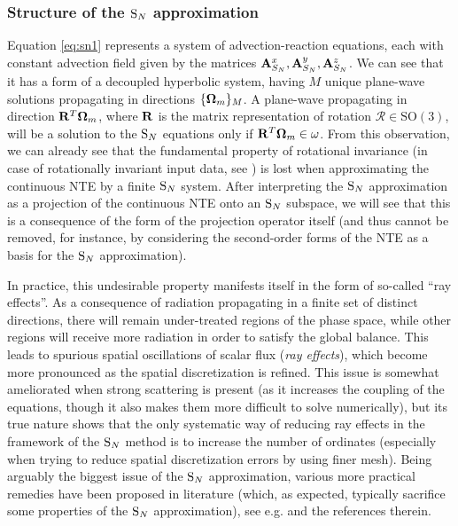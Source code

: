 \subsubsection{Structure of the $\text{S}_{N}$ approximation}
Equation \eqref{eq:sn1} represents a system of advection-reaction equations, each with constant advection field given by
the matrices $\mathbf{A}_{S_N}^x, \mathbf{A}_{S_N}^y, \mathbf{A}_{S_N}^z$. We can see that it has a form of a decoupled
hyperbolic system, having $M$ unique plane-wave solutions propagating in directions $\{\mathbf{\Omega}_m\}_{M}$. A
plane-wave propagating in direction $\mathbf{R}^T\mathbf{\Omega}_m$, where $\mathbf{R}$ is the matrix representation of rotation
$\mathcal{R}\in \mathrm{SO}(3)$, will be a solution to the $\text{S}_{N}$ equations only if $\mathbf{R}^T\mathbf{\Omega}_m \in \omega$. From
this observation, we can already see that the fundamental property of rotational invariance (in case of rotationally
invariant input data, see ) is lost when approximating the continuous NTE by a finite $\text{S}_{N}$ system.
After interpreting the $\text{S}_{N}$ approximation as a projection of the continuous NTE onto an $\text{S}_{N}$ subspace, we will see
that this is a consequence of the form of the projection operator itself (and thus cannot be removed, for instance, by
considering the second-order forms of the NTE as a basis for the $\text{S}_{N}$ approximation).

In practice, this undesirable property manifests itself in the form of so-called ``ray effects''. As a consequence of
radiation propagating in a finite set of distinct directions, there will remain under-treated regions of the phase
space, while other regions will receive more radiation in order to satisfy the global balance. This leads to spurious spatial oscillations
of scalar flux (\textit{ray effects}), which become more pronounced as the spatial discretization is refined.
This issue is somewhat ameliorated when strong scattering is present (as it increases the coupling of the equations,
though it also makes them more difficult to solve numerically), but its true nature shows that the only systematic way
of reducing ray effects in the framework of the $\text{S}_{N}$ method is to increase the number of ordinates (especially when
trying to reduce spatial discretization errors by using finer mesh). Being arguably the biggest issue of the $\text{S}_{N}$ approximation, various more practical
remedies have been proposed in literature (which, as expected, typically sacrifice some properties of the $\text{S}_{N}$
approximation), see e.g. \cite{Li1} and the references therein.

